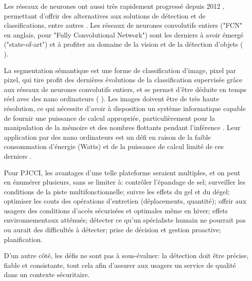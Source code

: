 \par Les réseaux de neurones ont aussi très rapidement progressé depuis 2012 \cite{beam_deep_2017}, permettant d'offrir des alternatives aux solutions de détection et de classifications, entre autres \cite{pathak_architecturally_2019}. Les réseaux de neurones convolutifs entiers ("FCN" en anglais, pour "Fully Convolutional Network") sont les derniers à avoir émergé ("state-of-art") \cite{zheng_real-time_2020} et à profiter au domaine de la vision et de la détection d'objets (\cite{nguyen_mavnet_2019} \cite{zheng_real-time_2020}).
\par La segmentation sémantique est une forme de classification d'image, pixel par pixel, qui tire profit des dernières évolutions de la classification supervisée grâce aux réseaux de neurones convolutifs entiers, et se permet d'être déduite en temps réel avec des nano ordinateurs (\cite{long_fully_2015} \cite{blanco-filgueira_deep_2019}). Les images doivent être de très haute résolution, ce qui nécessite d'avoir à disposition un système informatique capable de fournir une puissance de calcul appropriée, particulièrement pour la manipulation de la mémoire et des nombres flottants pendant l'inférence \cite{mody_low_2018}. Leur application par des nano ordinateurs est un défi en raison de la faible consommation d'énergie (Watts) et de la puissance de calcul limité de ces derniers \cite{copel_whats_2016}.
\par Pour PJCCI, les avantages d'une telle plateforme seraient multiples, et on peut en énumérer plusieurs, sans se limiter à: contrôler l'épandage de sel; surveiller les conditions de la piste multifonctionnelle; suivre les effets du gel et du dégel; optimiser les couts des opérations d'entretien (déplacements, quantité); offrir aux usagers des conditions d'accès sécurisées et optimales même en hiver; effets environnementaux atténués; détecter ce qu'un spécialiste humain ne pourrait pas ou aurait des difficultés à détecter; prise de décision et gestion proactive; planification.
\par D'un autre côté, les défis ne sont pas à sous-évaluer: la détection doit être précise, fiable et consistante, tout cela afin d'assurer aux usagers un service de qualité dans un contexte sécuritaire.